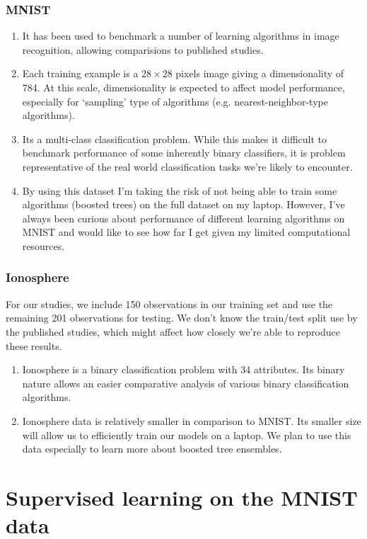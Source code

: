 \documentclass[10pt,letterpaper]{article}
\begin{document}
\subsubsection*{MNIST}
\begin{enumerate}
	\item It has been used to benchmark a number of learning algorithms in image recognition, allowing comparisions to published studies.
	\item Each training example is a $28\times28$ pixels image giving a dimensionality of 784. At this scale, dimensionality is expected to affect model performance, especially for `sampling' type of algorithms (e.g. nearest-neighbor-type algorithms). 
	\item Its a multi-class classification problem. While this makes it difficult to benchmark performance of some inherently binary classifiers, it is problem representative of the real world classification tasks we're likely to encounter. 
	\item {\color{magenta} By using this dataset I'm taking the risk of not being able to train some algorithms (boosted trees) on the full dataset on my laptop. However, I've always been curious about performance of different learning algorithms on MNIST and would like to see how far I get given my limited computational resources.}
\end{enumerate}
\subsubsection*{Ionosphere}
For our studies, we include 150 observations in our training set and use the remaining 201 observations for testing. We don't know the train/test split use by the published studies, which might affect how closely we're able to reproduce these results.
\begin{enumerate}
	\item Ionosphere is a binary classification problem with 34 attributes. Its binary nature allows an easier comparative analysis of various binary classification algorithms.  
	\item Ionosphere data is relatively smaller in comparison to MNIST. Its smaller size will allow us to efficiently train our models on a laptop. We plan to use this data especially to learn more about boosted tree ensembles.  
\end{enumerate}
\section{Supervised learning on the MNIST data}
\end{document}
